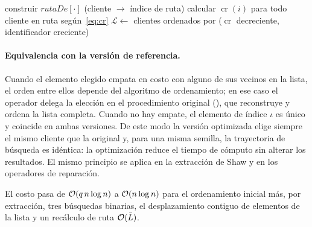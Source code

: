\begin{algorithm}[H]
\caption{ ()}
\label{alg:worst}
construir $\textit{rutaDe}[\cdot]$ (cliente $\to$ índice de ruta)\;
calcular $\operatorname{cr}(i)$ para todo cliente en ruta según~\eqref{eq:cr}\;
$\mathcal{L}\gets$ clientes ordenados por ($\operatorname{cr}$ decreciente, identificador creciente)\;
\end{algorithm}

\paragraph{Equivalencia con la versión de referencia.} Cuando el elemento elegido empata en
costo con alguno de sus vecinos en la lista, el orden entre ellos depende del algoritmo de
ordenamiento; en ese caso el operador delega la elección en el procedimiento original
(), que reconstruye y ordena la lista completa. Cuando no hay empate, el
elemento de índice $\iota$ es único y coincide en ambas versiones. De este modo la versión
optimizada elige siempre el mismo cliente que la original y, para una misma semilla, la
trayectoria de búsqueda es idéntica: la optimización reduce el tiempo de cómputo sin alterar
los resultados. El mismo principio se aplica en la extracción de Shaw y en los operadores de
reparación.

El costo pasa de $\mathcal{O}(q\,n\log n)$ a $\mathcal{O}(n\log n)$ para el ordenamiento inicial más, por
extracción, tres búsquedas binarias, el desplazamiento contiguo de elementos de la lista y un
recálculo de ruta $\mathcal{O}(\bar{L})$.

